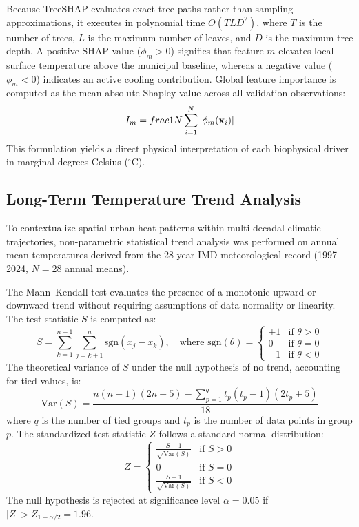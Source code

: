 \documentclass[a4paper,fleqn]{cas-sc}
\begin{document}
Because TreeSHAP evaluates exact tree paths rather than sampling approximations, it executes in polynomial time $O(T L D^2)$, where $T$ is the number of trees, $L$ is the maximum number of leaves, and $D$ is the maximum tree depth. A positive SHAP value ($\phi_m > 0$) signifies that feature $m$ elevates local surface temperature above the municipal baseline, whereas a negative value ($\phi_m < 0$) indicates an active cooling contribution. Global feature importance is computed as the mean absolute Shapley value across all validation observations:
\begin{equation}
    I_m = \\frac{1}{N} \sum_{i=1}^N |\phi_m(\mathbf{x}_i)|
    \label{eq:global_shap}
\end{equation}
This formulation yields a direct physical interpretation of each biophysical driver in marginal degrees Celsius ($^\circ\text{C}$).

\subsection{Long-Term Temperature Trend Analysis}
\label{subsec:trend_methods}

To contextualize spatial urban heat patterns within multi-decadal climatic trajectories, non-parametric statistical trend analysis was performed on annual mean temperatures derived from the 28-year IMD meteorological record (1997--2024, $N = 28$ annual means).

The Mann--Kendall test evaluates the presence of a monotonic upward or downward trend without requiring assumptions of data normality or linearity. The test statistic $S$ is computed as:
\begin{equation}
    S = \sum_{k=1}^{n-1} \sum_{j=k+1}^n \text{sgn}(x_j - x_k), \quad \text{where } \text{sgn}(\theta) = \begin{cases} +1 & \text{if } \theta > 0 \\ 0 & \text{if } \theta = 0 \\ -1 & \text{if } \theta < 0 \end{cases}
    \label{eq:mk_s}
\end{equation}
The theoretical variance of $S$ under the null hypothesis of no trend, accounting for tied values, is:
\begin{equation}
    \text{Var}(S) = \frac{n(n-1)(2n+5) - \sum_{p=1}^q t_p(t_p-1)(2t_p+5)}{18}
    \label{eq:mk_var}
\end{equation}
where $q$ is the number of tied groups and $t_p$ is the number of data points in group $p$. The standardized test statistic $Z$ follows a standard normal distribution:
\begin{equation}
    Z = \begin{cases} \frac{S - 1}{\sqrt{\text{Var}(S)}} & \text{if } S > 0 \\ 0 & \text{if } S = 0 \\ \frac{S + 1}{\sqrt{\text{Var}(S)}} & \text{if } S < 0 \end{cases}
    \label{eq:mk_z}
\end{equation}
The null hypothesis is rejected at significance level $\alpha = 0.05$ if $|Z| > Z_{1 - \alpha/2} = 1.96$.
\end{document}
